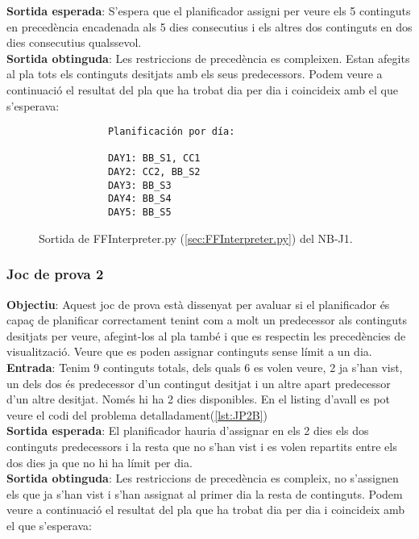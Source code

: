 \documentclass[a4paper]{article}
\begin{document}
	\noindent \textbf{Sortida esperada}: S'espera que el planificador assigni per veure els 5 continguts en precedència encadenada als 5 dies consecutius i els altres dos continguts en dos dies consecutius qualssevol. \\
	
	\noindent \textbf{Sortida obtinguda}: Les restriccions de  precedència es compleixen. Estan afegits al pla tots els continguts desitjats amb els seus predecessors. Podem veure a continuació el resultat del pla que ha trobat dia per dia i coincideix amb el que s'esperava:
	
	\begin{figure}[H]
		\centering
		\begin{verbatim}
			Planificación por día:
			
			DAY1: BB_S1, CC1
			DAY2: CC2, BB_S2
			DAY3: BB_S3
			DAY4: BB_S4
			DAY5: BB_S5		
		\end{verbatim}
		\caption{Sortida de FFInterpreter.py (\ref{sec:FFInterpreter.py}) del NB-J1.}
	\end{figure}
	
	
	\subsubsection*{Joc de prova 2}
	\noindent \textbf{Objectiu}: Aquest joc de prova està dissenyat per avaluar si el planificador és capaç de planificar correctament tenint com a molt un predecessor als continguts desitjats per veure, afegint-los al pla també i que es respectin les precedències de visualització. Veure que es poden assignar continguts sense límit a un dia. \\
	
	\noindent \textbf{Entrada}: Tenim 9 continguts totals, dels quals 6 es volen veure, 2 ja s'han vist, un dels dos és predecessor d'un contingut desitjat i un altre apart predecessor d'un altre desitjat. Només hi ha 2 dies disponibles. En el listing d'avall es pot veure el codi del problema detalladament(\ref{lst:JP2B}) \\
	
	\noindent \textbf{Sortida esperada}: El planificador hauria d'assignar en els 2 dies els dos continguts predecessors i la resta que no s'han vist i es volen repartits entre els dos dies ja que no hi ha límit per dia. \\
	
	\noindent \textbf{Sortida obtinguda}: Les restriccions de precedència es compleix, no s'assignen els que ja s'han vist i s'han assignat al primer dia la resta de continguts. Podem veure a continuació el resultat del pla que ha trobat dia per dia i coincideix amb el que s'esperava:
	
\end{document}
